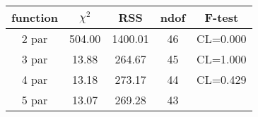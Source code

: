 \begin{tabular}{c|c|c|c|c}
function & $\chi^2$ & RSS & ndof & F-test \\
\hline
2 par & 504.00 & 1400.01 & 46 & CL=0.000 \\
3 par & 13.88 & 264.67 & 45 & CL=1.000 \\
4 par & 13.18 & 273.17 & 44 & CL=0.429 \\
5 par & 13.07 & 269.28 & 43 & \\
\hline
\end{tabular}